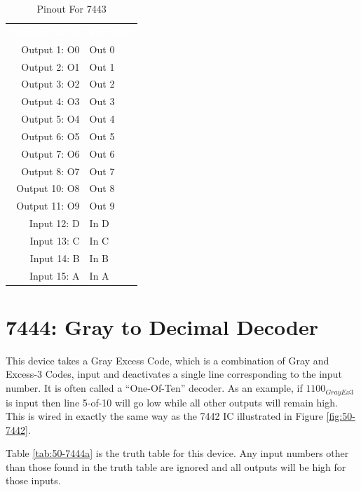 \begin{table}[H]
	\sffamily
	\newcommand{\head}[1]{\textcolor{white}{\textbf{#1}}}		
	\begin{center}
		\begin{tabular}{rl} 
			\rowcolor{black!75}
			\head{Logisim Label} & \head{Function} \\
			Output 1: O0  & Out 0 \\
			Output 2: O1  & Out 1 \\
			Output 3: O2  & Out 2 \\
			Output 4: O3  & Out 3 \\
			Output 5: O4  & Out 4 \\
			Output 6: O5  & Out 5 \\
			Output 7: O6  & Out 6 \\
			Output 8: O7  & Out 7 \\
			Output 10: O8 & Out 8 \\
			Output 11: O9 & Out 9 \\
			Input 12: D   & In D  \\
			Input 13: C   & In C  \\
			Input 14: B   & In B  \\
			Input 15: A   & In A  \\
		\end{tabular}
	\end{center}
	\caption{Pinout For 7443}
	\label{tab:50-7443b}
\end{table}

\section{7444: Gray to Decimal Decoder}

This device takes a Gray Excess Code, which is a combination of Gray and Excess-3 Codes, input and deactivates a single line corresponding to the input number. It is often called a ``One-Of-Ten'' decoder. As an example, if $ 1100_{GrayEx3} $ is input then line 5-of-10 will go low while all other outputs will remain high. This is wired in exactly the same way as the 7442 \ac{IC} illustrated in Figure \ref{fig:50-7442}.

Table \ref{tab:50-7444a} is the truth table for this device. Any input numbers other than those found in the truth table are ignored and all outputs will be high for those inputs.

